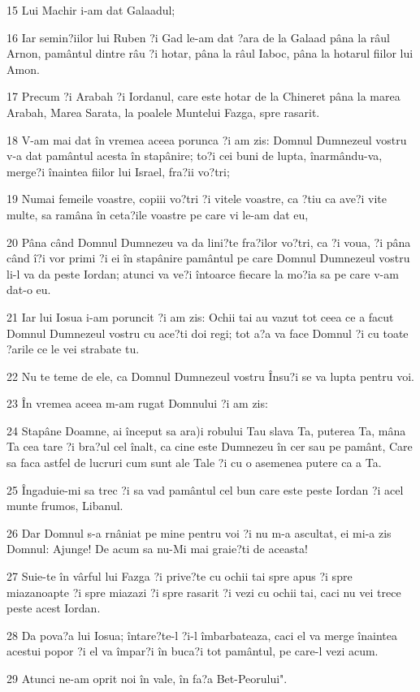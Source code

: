 \par 15 Lui Machir i-am dat Galaadul;
\par 16 Iar semin?iilor lui Ruben ?i Gad le-am dat ?ara de la Galaad pâna la râul Arnon, pamântul dintre râu ?i hotar, pâna la râul Iaboc, pâna la hotarul fiilor lui Amon.
\par 17 Precum ?i Arabah ?i Iordanul, care este hotar de la Chineret pâna la marea Arabah, Marea Sarata, la poalele Muntelui Fazga, spre rasarit.
\par 18 V-am mai dat în vremea aceea porunca ?i am zis: Domnul Dumnezeul vostru v-a dat pamântul acesta în stapânire; to?i cei buni de lupta, înarmându-va, merge?i înaintea fiilor lui Israel, fra?ii vo?tri;
\par 19 Numai femeile voastre, copiii vo?tri ?i vitele voastre, ca ?tiu ca ave?i vite multe, sa ramâna în ceta?ile voastre pe care vi le-am dat eu,
\par 20 Pâna când Domnul Dumnezeu va da lini?te fra?ilor vo?tri, ca ?i voua, ?i pâna când î?i vor primi ?i ei în stapânire pamântul pe care Domnul Dumnezeul vostru li-l va da peste Iordan; atunci va ve?i întoarce fiecare la mo?ia sa pe care v-am dat-o eu.
\par 21 Iar lui Iosua i-am poruncit ?i am zis: Ochii tai au vazut tot ceea ce a facut Domnul Dumnezeul vostru cu ace?ti doi regi; tot a?a va face Domnul ?i cu toate ?arile ce le vei strabate tu.
\par 22 Nu te teme de ele, ca Domnul Dumnezeul vostru Însu?i se va lupta pentru voi.
\par 23 În vremea aceea m-am rugat Domnului ?i am zis:
\par 24 Stapâne Doamne, ai început sa ara)i robului Tau slava Ta, puterea Ta, mâna Ta cea tare ?i bra?ul cel înalt, ca cine este Dumnezeu în cer sau pe pamânt, Care sa faca astfel de lucruri cum sunt ale Tale ?i cu o asemenea putere ca a Ta.
\par 25 Îngaduie-mi sa trec ?i sa vad pamântul cel bun care este peste Iordan ?i acel munte frumos, Libanul.
\par 26 Dar Domnul s-a rnâniat pe mine pentru voi ?i nu m-a ascultat, ei mi-a zis Domnul: Ajunge! De acum sa nu-Mi mai graie?ti de aceasta!
\par 27 Suie-te în vârful lui Fazga ?i prive?te cu ochii tai spre apus ?i spre miazanoapte ?i spre miazazi ?i spre rasarit ?i vezi cu ochii tai, caci nu vei trece peste acest Iordan.
\par 28 Da pova?a lui Iosua; întare?te-l ?i-l îmbarbateaza, caci el va merge înaintea acestui popor ?i el va împar?i în buca?i tot pamântul, pe care-l vezi acum.
\par 29 Atunci ne-am oprit noi în vale, în fa?a Bet-Peorului".

